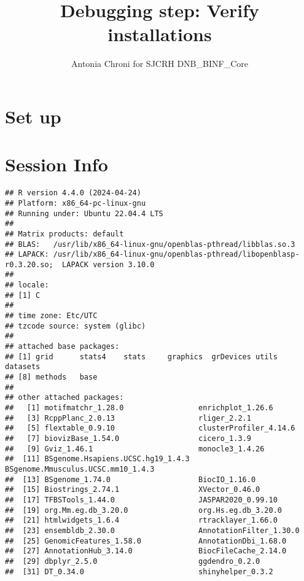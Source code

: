 \documentclass[
  11pt,
  a4paper,
]{article}
\title{Debugging step: Verify installations}
\author{Antonia Chroni for SJCRH DNB\_BINF\_Core}
\date{}
\begin{document}
\maketitle

{
\hypersetup{linkcolor=}
\setcounter{tocdepth}{2}
\tableofcontents
}
\section{Set up}\label{set-up}

\section{Session Info}\label{session-info}

\begin{verbatim}
## R version 4.4.0 (2024-04-24)
## Platform: x86_64-pc-linux-gnu
## Running under: Ubuntu 22.04.4 LTS
## 
## Matrix products: default
## BLAS:   /usr/lib/x86_64-linux-gnu/openblas-pthread/libblas.so.3 
## LAPACK: /usr/lib/x86_64-linux-gnu/openblas-pthread/libopenblasp-r0.3.20.so;  LAPACK version 3.10.0
## 
## locale:
## [1] C
## 
## time zone: Etc/UTC
## tzcode source: system (glibc)
## 
## attached base packages:
## [1] grid      stats4    stats     graphics  grDevices utils     datasets 
## [8] methods   base     
## 
## other attached packages:
##   [1] motifmatchr_1.28.0                 enrichplot_1.26.6                 
##   [3] RcppPlanc_2.0.13                   rliger_2.2.1                      
##   [5] flextable_0.9.10                   clusterProfiler_4.14.6            
##   [7] biovizBase_1.54.0                  cicero_1.3.9                      
##   [9] Gviz_1.46.1                        monocle3_1.4.26                   
##  [11] BSgenome.Hsapiens.UCSC.hg19_1.4.3  BSgenome.Mmusculus.UCSC.mm10_1.4.3
##  [13] BSgenome_1.74.0                    BiocIO_1.16.0                     
##  [15] Biostrings_2.74.1                  XVector_0.46.0                    
##  [17] TFBSTools_1.44.0                   JASPAR2020_0.99.10                
##  [19] org.Mm.eg.db_3.20.0                org.Hs.eg.db_3.20.0               
##  [21] htmlwidgets_1.6.4                  rtracklayer_1.66.0                
##  [23] ensembldb_2.30.0                   AnnotationFilter_1.30.0           
##  [25] GenomicFeatures_1.58.0             AnnotationDbi_1.68.0              
##  [27] AnnotationHub_3.14.0               BiocFileCache_2.14.0              
##  [29] dbplyr_2.5.0                       ggdendro_0.2.0                    
##  [31] DT_0.34.0                          shinyhelper_0.3.2                 

\end{verbatim}
\end{document}
